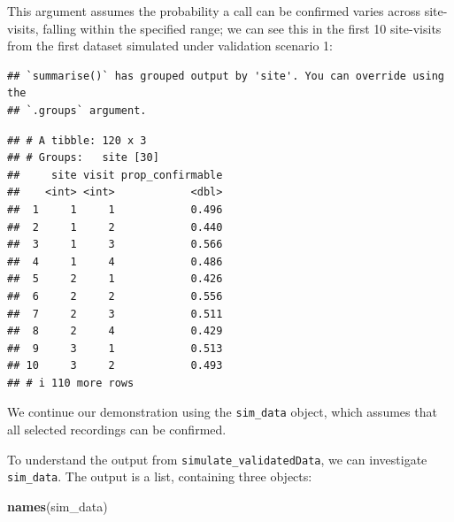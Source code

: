 \documentclass[
]{article}
\newenvironment{Shaded}{\begin{snugshade}}{\end{snugshade}}
\newcommand{\AttributeTok}[1]{\textcolor[rgb]{0.13,0.29,0.53}{#1}}
\newcommand{\CommentTok}[1]{\textcolor[rgb]{0.56,0.35,0.01}{\textit{#1}}}
\newcommand{\DecValTok}[1]{\textcolor[rgb]{0.00,0.00,0.81}{#1}}
\newcommand{\FunctionTok}[1]{\textcolor[rgb]{0.13,0.29,0.53}{\textbf{#1}}}
\newcommand{\NormalTok}[1]{#1}
\newcommand{\SpecialCharTok}[1]{\textcolor[rgb]{0.81,0.36,0.00}{\textbf{#1}}}
\begin{document}
This argument assumes the probability a call can be confirmed varies across site-visits, falling within the specified range; we can see this in the first 10 site-visits from the first dataset simulated under validation scenario 1:

\linespread{1}

\begin{Shaded}
\end{Shaded}

\begin{verbatim}
## `summarise()` has grouped output by 'site'. You can override using the
## `.groups` argument.
\end{verbatim}

\begin{verbatim}
## # A tibble: 120 x 3
## # Groups:   site [30]
##     site visit prop_confirmable
##    <int> <int>            <dbl>
##  1     1     1            0.496
##  2     1     2            0.440
##  3     1     3            0.566
##  4     1     4            0.486
##  5     2     1            0.426
##  6     2     2            0.556
##  7     2     3            0.511
##  8     2     4            0.429
##  9     3     1            0.513
## 10     3     2            0.493
## # i 110 more rows
\end{verbatim}

\linespread{1}

We continue our demonstration using the \texttt{sim\_data} object, which assumes that all selected recordings can be confirmed.

To understand the output from \texttt{simulate\_validatedData}, we can investigate \texttt{sim\_data}. The output is a list, containing three objects:

\linespread{1}

\begin{Shaded}
\begin{Highlighting}[]
\FunctionTok{names}\NormalTok{(sim\_data)}
\end{Highlighting}
\end{Shaded}
\end{document}
